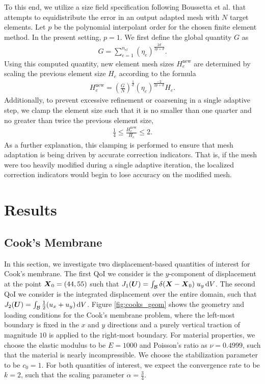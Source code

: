 To this end, we utilize a size field specification following Boussetta et al.
\cite{boussetta2006adaptive} that attempts to equidistribute the error in an
output adapted mesh with $N$ target elements. Let $p$ be the polynomial
interpolant order for the chosen finite element method. In the present
setting, $p=1$. We first define the global quantity $G$ as
%
\begin{gather}
G = \sum_{e=1}^{n_{el}} ( \eta_e ) ^{\frac{2d}{2p+d}}.
\label{eq:mech_global_size_quantity}
\end{gather}
%
Using this computed quantity, new element mesh sizes $H_e^{\text{new}}$ are
determined by scaling the previous element size $H_e$ according to the
formula
%
\begin{gather}
H_e^{\text{new}} = \left( \frac{G}{N} \right)^{\frac{1}{d}}
( \eta_e )^{\frac{-2}{2p + d}} H_e.
\label{eq:mech_size_field}
\end{gather}
%
Additionally, to prevent excessive refinement or coarsening in a single
adaptive step, we clamp the element size such that it is no smaller than
one quarter and no greater than twice the previous element size,
%
\begin{gather}
\frac14 \leq \frac{H_e^{\text{new}}}{H_e} \leq 2.
\label{eq:mech_size_clamping}
\end{gather}
%
As a further explanation, this clamping is performed to ensure that mesh
adaptation is being driven by accurate correction indicators. That is,
if the mesh were too heavily modified during a single adaptive iteration,
the localized correction indicators would begin to lose accuracy on the
modified mesh.

\section{Results}

\subsection{Cook's Membrane}

In this section, we investigate two displacement-based quantities of
interest for Cook's membrane. The first QoI we consider is
the $y$-component of displacement at the point $\boldsymbol{X}_0 = (44,55)$ such
that $J_1(\boldsymbol{U}) = \int_{\mathcal{B}} \delta(\boldsymbol{X} - \boldsymbol{X}_0) \; u_y \, \text{d} V$. 
The second QoI we consider is the integrated displacement
over the entire domain, such that $J_2(\boldsymbol{U}) = \int_{\mathcal{B}} \frac12 (u_x + u_y)
\, \text{d} V$. Figure \ref{fig:cooks_geom} shows the geometry and loading
conditions for the Cook's membrane problem, where the left-most boundary
is fixed in the $x$ and $y$ directions and a purely vertical traction of
magnitude $10$ is applied to the right-most boundary. For material
properties, we choose the elastic modulus to be $E=1000$ and Poisson's
ratio as $\nu = 0.4999$, such that the material is nearly incompressible.
We choose the stabilization parameter to be $c_0 = 1$. For both
quantities of interest, we expect the convergence rate to be $k = 2$, such
that the scaling parameter $\alpha = \frac34$.

